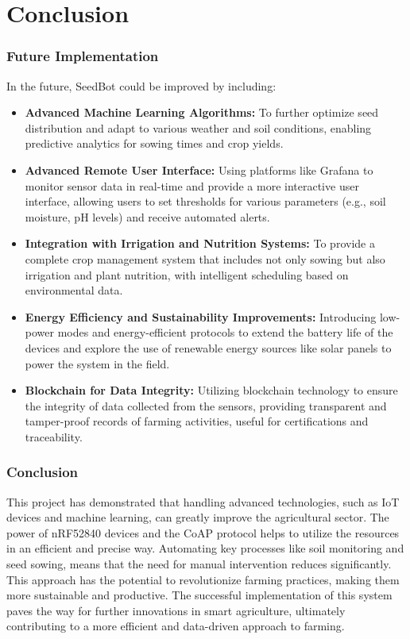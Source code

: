 \chapter{Conclusion}


\subsection{Future Implementation}

In the future, SeedBot could be improved by including:

\begin{itemize}
    \item \textbf{Advanced Machine Learning Algorithms:} To further optimize seed distribution and adapt to various weather and soil conditions, enabling predictive analytics for sowing times and crop yields.
    \item \textbf{Advanced Remote User Interface:} Using platforms like Grafana to monitor sensor data in real-time and provide a more interactive user interface, allowing users to set thresholds for various parameters (e.g., soil moisture, pH levels) and receive automated alerts.
    \item \textbf{Integration with Irrigation and Nutrition Systems:} To provide a complete crop management system that includes not only sowing but also irrigation and plant nutrition, with intelligent scheduling based on environmental data.
    \item \textbf{Energy Efficiency and Sustainability Improvements:} Introducing low-power modes and energy-efficient protocols to extend the battery life of the devices and explore the use of renewable energy sources like solar panels to power the system in the field.
    \item \textbf{Blockchain for Data Integrity:} Utilizing blockchain technology to ensure the integrity of data collected from the sensors, providing transparent and tamper-proof records of farming activities, useful for certifications and traceability.
\end{itemize}



\subsection{Conclusion}

This project has demonstrated that handling advanced technologies, such as IoT devices and machine learning, can greatly improve the agricultural sector. The power of nRF52840 devices and the CoAP protocol helps to utilize the resources in an efficient and precise way.
Automating key processes like soil monitoring and seed sowing, means that the need for manual intervention reduces significantly. This approach has the potential to revolutionize farming practices, making them more sustainable and productive. The successful implementation of this system paves the way for further innovations in smart agriculture, ultimately contributing to a more efficient and data-driven approach to farming.